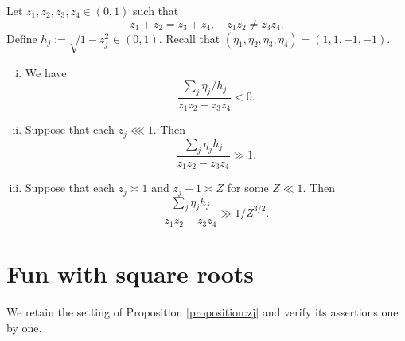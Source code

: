 \documentclass[reqno]{amsart} 
\begin{document}
\begin{proposition}\label{proposition:zj}
  Let $z_1,z_2,z_3,z_4 \in (0,1)$ such that
  \begin{equation*}
    z_1 + z_2 = z_3 + z_4, \quad z_1 z_2 \neq z_3 z_4.
  \end{equation*}  
  Define $h_j := \sqrt{1 - z_j^2} \in (0,1)$.  Recall that $(\eta_1,\eta_2,\eta_3,\eta_4) = (1,1,-1,-1)$.
  \begin{enumerate}[(i)]
  \item We have
    \begin{equation}\label{eqn:eta-sign}
      \frac{\sum _j \eta _j / h _j }{ z _1 z _2 - z_3 z_4 } < 0.
    \end{equation}
  \item Suppose that each $z_j \lll 1$.  Then
    \begin{equation}\label{eqn:eta-lower-1}
      \frac{\sum _j \eta _j h _j }{ z _1 z _2  - z _3 z _4 } \gg 1.
    \end{equation}
  \item Suppose that each $z_j \asymp 1$ and $z_j - 1 \asymp Z$ for some $Z \ll 1$.  Then
    \begin{equation}\label{eqn:eta-lower-2}
      \frac{\sum _j \eta _j h _j }{ z _1 z _2  - z _3 z _4 } \gg 1/Z^{3/2}.
    \end{equation}
  \end{enumerate}
\end{proposition}


\section{Fun with square roots}\label{sec:cqx50a0chs}
We retain the setting of Proposition \ref{proposition:zj} and verify its assertions one by one.
\end{document}
